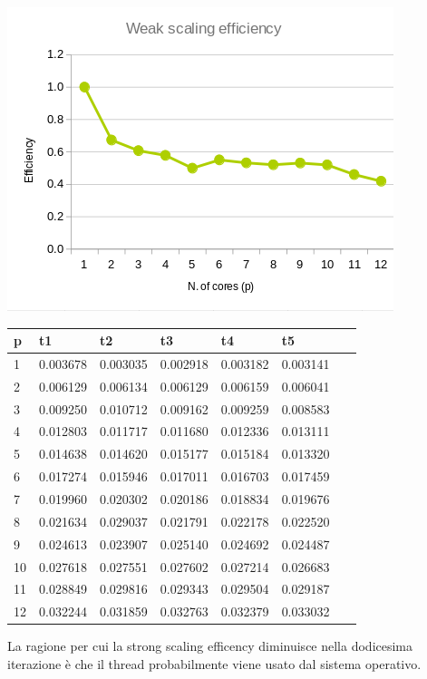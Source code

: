 \documentclass[a4paper,12pt, twoside]{report}
\begin{document}
\includegraphics[scale=0.5]{images/mpi_weak.png}
\begin{table}[!ht]
    \centering
    \begin{tabular}{|l|l|l|l|l|l|l|}
    \hline
        p & t1 & t2 & t3 & t4 & t5 & ~ \\ \hline
        1 & 0.003678 & 0.003035 & 0.002918 & 0.003182 & 0.003141 & ~ \\ \hline
        2 & 0.006129 & 0.006134 & 0.006129 & 0.006159 & 0.006041 & ~ \\ \hline
        3 & 0.009250 & 0.010712 & 0.009162 & 0.009259 & 0.008583 & ~ \\ \hline
        4 & 0.012803 & 0.011717 & 0.011680 & 0.012336 & 0.013111 & ~ \\ \hline
        5 & 0.014638 & 0.014620 & 0.015177 & 0.015184 & 0.013320 & ~ \\ \hline
        6 & 0.017274 & 0.015946 & 0.017011 & 0.016703 & 0.017459 & ~ \\ \hline
        7 & 0.019960 & 0.020302 & 0.020186 & 0.018834 & 0.019676 & ~ \\ \hline
        8 & 0.021634 & 0.029037 & 0.021791 & 0.022178 & 0.022520 & ~ \\ \hline
        9 & 0.024613 & 0.023907 & 0.025140 & 0.024692 & 0.024487 & ~ \\ \hline
        10 & 0.027618 & 0.027551 & 0.027602 & 0.027214 & 0.026683 & ~ \\ \hline
        11 & 0.028849 & 0.029816 & 0.029343 & 0.029504 & 0.029187 & ~ \\ \hline
        12 & 0.032244 & 0.031859 & 0.032763 & 0.032379 & 0.033032 & ~ \\ \hline
    \end{tabular}
\end{table}
\newline
La ragione per cui la strong scaling efficency diminuisce nella dodicesima iterazione è che il thread probabilmente viene usato dal sistema operativo.
\end{document}
